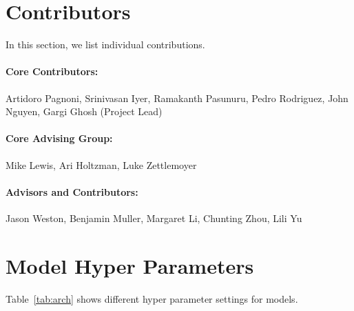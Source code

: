\documentclass[]{fairmeta}
\begin{document}
\section*{Contributors}

In this section, we list individual contributions.

\paragraph{\textbf{Core Contributors:}} Artidoro Pagnoni, Srinivasan Iyer, Ramakanth Pasunuru, Pedro Rodriguez, John Nguyen, Gargi Ghosh (Project Lead)

\vspace{0.2em}

\paragraph{\textbf{Core Advising Group:}} Mike Lewis, Ari Holtzman, Luke Zettlemoyer

\vspace{0.2em}

\paragraph{\textbf{Advisors and Contributors:}} Jason Weston, Benjamin Muller, Margaret Li, Chunting Zhou, Lili Yu


\clearpage
\newpage



\clearpage
\newpage
\beginappendix
\label{section:appendix}

\section{Model Hyper Parameters}

Table~\ref{tab:arch} shows different hyper parameter settings for \model{} models.
\end{document}
